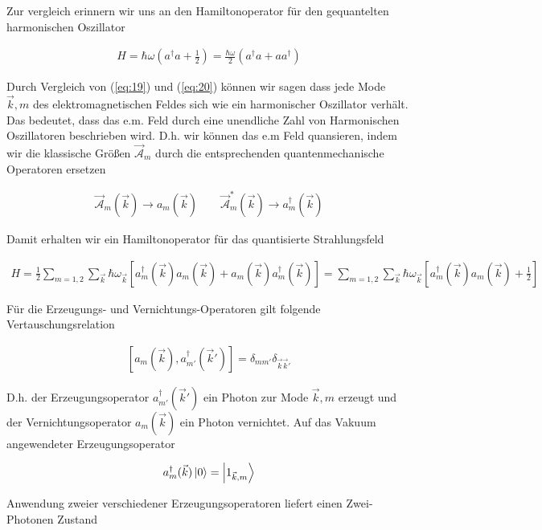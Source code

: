 Zur vergleich erinnern wir uns an den Hamiltonoperator für den gequantelten harmonischen Oszillator

\begin{align}
  \label{eq:20}
  H = \hbar\omega(a^\dagger a+\frac{1}{2})  = \frac{\hbar \omega}{2}(a^\dagger a + a a^\dagger)
\end{align}

Durch Vergleich von (\ref{eq:19}) und (\ref{eq:20}) können wir sagen dass jede Mode \(\vec k,m\) des elektromagnetischen Feldes sich wie ein harmonischer Oszillator verhält. Das bedeutet, dass das e.m. Feld durch eine unendliche Zahl von Harmonischen Oszillatoren beschrieben wird. D.h. wir können das e.m Feld quansieren, indem wir die klassische Größen \(\vec{\mathcal A}_{m}\) durch die entsprechenden quantenmechanische Operatoren ersetzen

\begin{align}
  \label{eq:21}
  \vec{\mathcal A}_{m}(\vec k) \rightarrow a_m(\vec k) \qquad \vec{ \mathcal A}_{m}^*(\vec k) \rightarrow a_m^\dagger(\vec k) 
\end{align}

Damit erhalten wir ein Hamiltonoperator für das quantisierte Strahlungsfeld

\begin{align}
  \label{eq:22}
 \boxed{  H = \frac{1}{2} \sum_{m=1,2} \sum_{\vec k} \hbar \omega_{\vec k} \left[ a^\dagger_m(\vec k) a_m(\vec k) + a_m(\vec k) a^\dagger_m(\vec k) \right] =   \sum_{m=1,2} \sum_{\vec k} \hbar \omega_{\vec k} \left[  a^\dagger_m(\vec k) a_m(\vec k) + \frac{1}{2}\right] }
\end{align}

Für die Erzeugungs- und Vernichtungs-Operatoren gilt folgende Vertauschungsrelation

\begin{align}
  \label{eq:23}
  [ a_m(\vec k), a^\dagger_{m'}(\vec k') ] = \delta_{mm'}\delta_{\vec k\vec k'}
\end{align}

D.h. der Erzeugungsoperator \(a^\dagger_{m'}(\vec k')\) ein Photon zur Mode \(\vec k,m\) erzeugt und der Vernichtungsoperator \(a_m(\vec k)\) ein Photon vernichtet. Auf das Vakuum angewendeter Erzeugungsoperator

\begin{align}
  \label{eq:24}
  a^\dagger_{m}(\vec k) \left| 0 \right\rangle = \left| 1_{\vec k,m} \right\rangle
\end{align}

Anwendung zweier verschiedener Erzeugungsoperatoren liefert einen Zwei-Photonen Zustand

